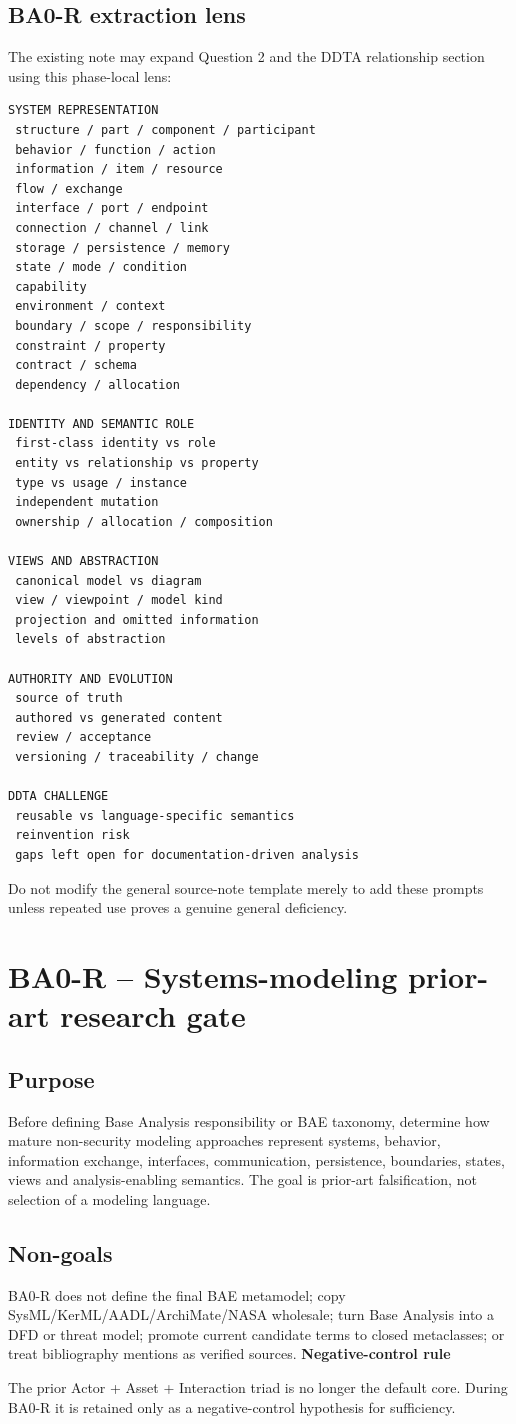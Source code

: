 \documentclass[11pt,a4paper]{article}
\newenvironment{boundary}[1]{\def\FrameCommand{\fcolorbox{ddtaorange}{ddtagray}}\MakeFramed{\advance\hsize-2\width\FrameRestore}\noindent\textbf{#1}\par\smallskip}{\endMakeFramed}
\begin{document}
\subsection{BA0-R extraction lens}
The existing note may expand Question 2 and the DDTA relationship section using this phase-local lens:
\begin{lstlisting}
SYSTEM REPRESENTATION
 structure / part / component / participant
 behavior / function / action
 information / item / resource
 flow / exchange
 interface / port / endpoint
 connection / channel / link
 storage / persistence / memory
 state / mode / condition
 capability
 environment / context
 boundary / scope / responsibility
 constraint / property
 contract / schema
 dependency / allocation

IDENTITY AND SEMANTIC ROLE
 first-class identity vs role
 entity vs relationship vs property
 type vs usage / instance
 independent mutation
 ownership / allocation / composition

VIEWS AND ABSTRACTION
 canonical model vs diagram
 view / viewpoint / model kind
 projection and omitted information
 levels of abstraction

AUTHORITY AND EVOLUTION
 source of truth
 authored vs generated content
 review / acceptance
 versioning / traceability / change

DDTA CHALLENGE
 reusable vs language-specific semantics
 reinvention risk
 gaps left open for documentation-driven analysis
\end{lstlisting}
Do not modify the general source-note template merely to add these prompts unless repeated use proves a genuine general deficiency.

\section{BA0-R -- Systems-modeling prior-art research gate}
\subsection{Purpose}
Before defining Base Analysis responsibility or BAE taxonomy, determine how mature non-security modeling approaches represent systems, behavior, information exchange, interfaces, communication, persistence, boundaries, states, views and analysis-enabling semantics. The goal is prior-art falsification, not selection of a modeling language.
\subsection{Non-goals}
BA0-R does not define the final BAE metamodel; copy SysML/KerML/AADL/ArchiMate/NASA wholesale; turn Base Analysis into a DFD or threat model; promote current candidate terms to closed metaclasses; or treat bibliography mentions as verified sources.
\begin{boundary}{Negative-control rule}
The prior Actor + Asset + Interaction triad is no longer the default core. During BA0-R it is retained only as a negative-control hypothesis for sufficiency.
\end{boundary}
\end{document}
